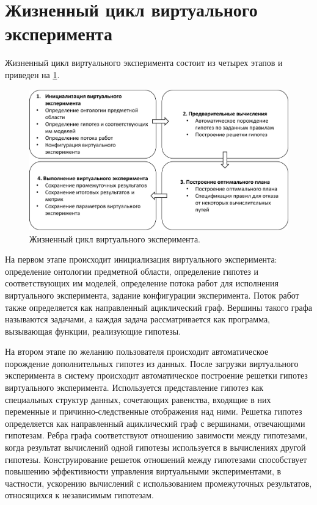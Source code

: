 \section{Жизненный цикл виртуального эксперимента} \label{sect2_2}
Жизненный цикл виртуального эксперимента состоит из четырех этапов и приведен на \cref{fig:lifecycle_ve}. 


\begin{figure}[ht]
    \centering
    \includegraphics[width=0.9\linewidth]{images/ve_cycle.pdf}
    \caption{Жизненный цикл виртуального эксперимента.}\label{fig:lifecycle_ve}
\end{figure}

На первом этапе происходит инициализация виртуального эксперимента: определение онтологии предметной области, 
определение гипотез и соответствующих им моделей, определение потока работ для исполнения виртуального эксперимента, 
задание конфигурации эксперимента. Поток работ также определяется как направленный ациклический граф. Вершины такого 
графа называются задачами, а каждая задача рассматривается как программа, вызывающая функции, реализующие гипотезы.

На втором этапе по желанию пользователя происходит автоматическое порождение дополнительных гипотез из данных. 
После загрузки виртуального эксперимента в систему происходит автоматическое построение решетки гипотез виртуального 
эксперимента. Используется представление гипотез как специальных структур данных, сочетающих равенства, входящие в 
них переменные и причинно-следственные отображения над ними. Решетка гипотез определяется как направленный ациклический 
граф с вершинами, отвечающими гипотезам. Ребра графа соответствуют отношению завимости между гипотезами, когда 
результат вычислений одной гипотезы используется в вычислениях другой гипотезы. Конструирование решеток отношений 
между гипотезами способствует повышению эффективности управления виртуальными экспериментами, в частности, ускорению 
вычислений с использованием промежуточных результатов, относящихся к независимым гипотезам. 

